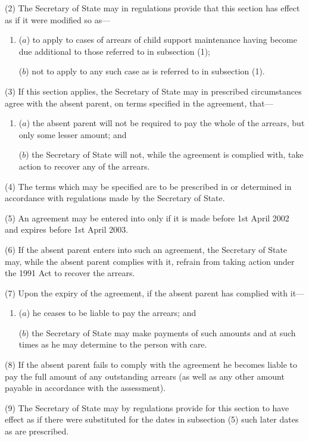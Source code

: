 \documentclass[12pt,a4paper]{article}
\begin{document}
(2) The Secretary of State may in regulations provide that this section has effect as if it were modified so as—
\begin{enumerate}\item[]
($a$) to apply to cases of arrears of child support maintenance having become due additional to those referred to in subsection (1);

($b$) not to apply to any such case as is referred to in subsection (1).
\end{enumerate}

(3) If this section applies, the Secretary of State may in prescribed circumstances agree with the absent parent, on terms specified in the agreement, that—
\begin{enumerate}\item[]
($a$) the absent parent will not be required to pay the whole of the arrears, but only some lesser amount; and

($b$) the Secretary of State will not, while the agreement is complied with, take action to recover any of the arrears.
\end{enumerate}

(4) The terms which may be specified are to be prescribed in or determined in accordance with regulations made by the Secretary of State.

(5) An agreement may be entered into only if it is made before 1st April 2002 and expires before 1st April 2003. 

(6) If the absent parent enters into such an agreement, the Secretary of State may, while the absent parent complies with it, refrain from taking action under the 1991 Act to recover the arrears.

(7) Upon the expiry of the agreement, if the absent parent has complied with it—
\begin{enumerate}\item[]
($a$) he ceases to be liable to pay the arrears; and

($b$) the Secretary of State may make payments of such amounts and at such times as he may determine to the person with care.
\end{enumerate}

(8) If the absent parent fails to comply with the agreement he becomes liable to pay the full amount of any outstanding arrears (as well as any other amount payable in accordance with the assessment).

(9) The Secretary of State may by regulations provide for this section to have effect as if there were substituted for the dates in subsection (5)  such later dates as are prescribed.
\end{document}
